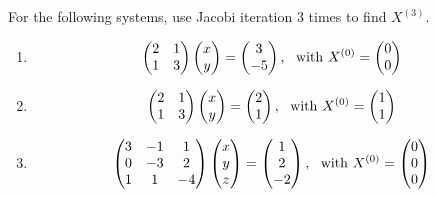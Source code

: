 {

For the following systems, use Jacobi iteration 3 times to find $X^{(3)}$.
\begin{enumerate}[label=\alph*)]
	\item \begin{align*}
	\begin{pmatrix}
	2 & 1 \\
	1 & 3
	\end{pmatrix}
	\begin{pmatrix}
	x \\
	y
	\end{pmatrix}
	=
	\begin{pmatrix}
	3 \\
	-5
	\end{pmatrix}, \,\,\,\,
	{\rm with} \,\,
	X^{(0)}=
	\begin{pmatrix}
	0 \\
	0
	\end{pmatrix}	
	\end{align*}
	
	\item \begin{align*}
	\begin{pmatrix}
	2 & 1 \\
	1 & 3
	\end{pmatrix}
	\begin{pmatrix}
	x \\
	y
	\end{pmatrix}
	=
	\begin{pmatrix}
	2 \\
	1
	\end{pmatrix}, \,\,\,\,
	{\rm with} \,\,
	X^{(0)}=
	\begin{pmatrix}
	1 \\
	1
	\end{pmatrix}
	\end{align*}
	
	
	\item \begin{align*}
	\begin{pmatrix}
	3 & -1 &  1 \\
	0 & -3 &  2 \\
	1 &  1 & -4
	\end{pmatrix}
	\begin{pmatrix}
	x \\
	y \\
	z
	\end{pmatrix}
	=
	\begin{pmatrix}
	1 \\
	2 \\
	-2
	\end{pmatrix}, \,\,\,\,
	{\rm with} \,\,
	X^{(0)}=
	\begin{pmatrix}
	0 \\
	0 \\
	0
	\end{pmatrix}
	\end{align*}
	

\end{enumerate}}
